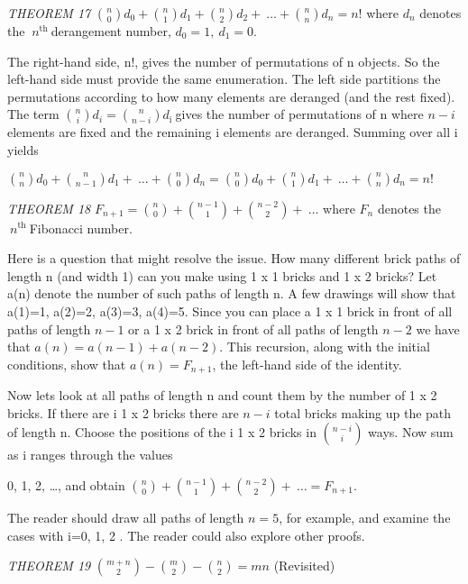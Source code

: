 \documentclass[10pt,letter]{article}
\begin{document}
\emph{THEOREM 17} \(\binom{n}{0}
d_{0} +
\binom{n}{1}
d_{1} +
\binom{n}{2}
d_{2} + \ \ldots +
\binom{n}{n}
d_{n} = n!\) where \(d_{n}\) denotes the
\(\ n^{\text{th}}\ \)derangement number, \(d_{0} = 1,\ d_{1} = 0.\)

The right-hand side, n!, gives the number of permutations of n objects.
So the left-hand side must provide the same enumeration. The left side
partitions the permutations according to how many elements are deranged
(and the rest fixed). The term \(\binom{n}{i}
d_{i} =
\binom{n}{n - i}
d_{\text{i\ }}\)gives the number of permutations of n where
\(n - i\) elements are fixed and the remaining i elements are deranged.
Summing over all i yields

\(\binom{n}{n}
d_{0} +
\binom{n}{n - 1}
d_{1} + \ \ldots +
\binom{n}{0}
d_{n} =
\binom{n}{0}
d_{0} +
\binom{n}{1}
d_{1} + \ \ldots +
\binom{n}{n}
d_{n} = n!\)

\emph{THEOREM 18} \(F_{n + 1} =
\binom{n}{0}
 +
\binom{n - 1}{1}
 +
\binom{n - 2}{2}
 + \ \ldots\) where \(F_{n}\) denotes the
\(\ n^{\text{th}}\ \)Fibonacci number.

Here is a question that might resolve the issue. How many different
brick paths of length n (and width 1) can you make using 1 x 1 bricks
and 1 x 2 bricks? Let a(n) denote the number of such paths of length n.
A few drawings will show that a(1)=1, a(2)=2, a(3)=3, a(4)=5. Since you
can place a 1 x 1 brick in front of all paths of length \(n - 1\) or a 1
x 2 brick in front of all paths of length \(n - 2\) we have that
\(a\left( n \right) = a\left( n - 1 \right) + a\left( n - 2 \right)\).
This recursion, along with the initial conditions, show that
\(a\left( n \right) = F_{n + 1}\), the left-hand side of the identity.

Now lets look at all paths of length n and count them by the number of 1
x 2 bricks. If there are i 1 x 2 bricks there are \(n - i\) total bricks
making up the path of length n. Choose the positions of the i 1 x 2
bricks in \(\binom{n - i}{i}
\) ways. Now sum as i ranges through the values

0, 1, 2, \ldots{}, and obtain \(\binom{n}{0}
 +
\binom{n - 1}{1}
 +
\binom{n - 2}{2}
 + \ \ldots = F_{n + 1}\).

The reader should draw all paths of length \(n = 5\), for example, and
examine the cases with i=0, 1, 2 . The reader could also explore other
proofs.

\emph{THEOREM 19} \(\binom{m + n}{2}
 -
\binom{m}{2}
 -
\binom{n}{2}
 = mn\) (Revisited)
\end{document}
